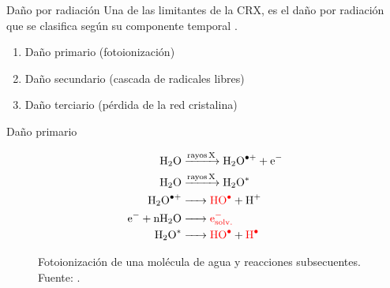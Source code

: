 \documentclass{beamer}
\begin{document}
\begin{frame}{Daño por radiación}
Una de las limitantes de la CRX, es el daño por radiación que se clasifica según su componente temporal \cite{Teng2000}.
  \begin{enumerate}
	\item Daño primario (fotoionización)
	\item Daño secundario (cascada de radicales libres)
	\item Daño terciario (pérdida de la red cristalina)
	\end{enumerate}
\end{frame}
\begin{frame}{Daño primario}
\begin{figure}
  \begin{align}
  \ce{H2O           &->[rayos X]     H2O^{.+}    +             e^{-}}  \\
  \ce{H2O           &->[rayos X]     H2O^{*}}                          \\
  \ce{H2O^{.+}      &->  \color{red}HO^{.}       +              H^{+}} \\
  \ce{e^{-} + nH2O  &->  \color{red}e^{-}_{solv.}}                     \\
  \ce{H2O^{*}       &->  \color{red}HO^{.}       +   \color{red}H^{.}}
  \end{align} 
  \caption{Fotoionización de una molécula de agua y reacciones subsecuentes. Fuente: \cite{VonSonntag2006}.}  
  \label{fig:vonsonntag2006}
\end{figure}
\end{frame}
\end{document}
